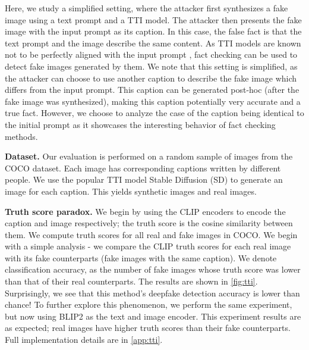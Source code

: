 \documentclass{article} \usepackage{iclr2024_conference,times}
\begin{document}
Here, we study a simplified setting, where the attacker first synthesizes a fake image using a text prompt and a TTI model. The attacker then presents the fake image with the input prompt as its caption. In this case, the false fact is that the text prompt and the image describe the same content. As TTI models are known not to be perfectly aligned with the input prompt \citep{imagereward,attend_and_excite}, fact checking can be used to detect fake images generated by them. We note that this setting is simplified, as the attacker can choose to use another caption to describe the fake image which differs from the input prompt. This caption can be generated post-hoc (after the fake image was synthesized), making this caption potentially very accurate and a true fact. However, we choose to analyze the case of the caption being identical to the initial prompt as it showcases the interesting behavior of fact checking methods.   

\textbf{Dataset.} Our evaluation is performed on a random sample of  images from the COCO \citep{coco} dataset. Each image has  corresponding captions written by different people. We use the popular TTI model Stable Diffusion (SD) to generate an image for each caption. This yields  synthetic images and  real images.   

\textbf{Truth score paradox.} We begin by using the CLIP \citep{clip} encoders to encode the caption and image respectively; the truth score is the cosine similarity between them. We compute truth scores for all real and fake images in COCO. We begin with a simple analysis - we compare the CLIP truth scores for each real image with its fake counterparts (fake images with the same caption). We denote classification accuracy, as the number of fake images whose truth score was lower than that of their real counterparts. The results are shown in \cref{fig:tti}. Surprisingly, we see that this method's deepfake detection accuracy is lower than chance! To further explore this phenomenon, we perform the same experiment, but now using BLIP2 \citep{blip2} as the text and image encoder. This experiment results are as expected; real images have higher truth scores than their fake counterparts. Full implementation details are in \cref{app:tti}.
\end{document}
